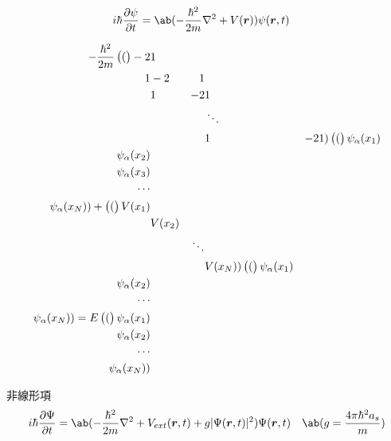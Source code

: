 \documentclass[uplatex,diffipdfmx,a4paper,11pt]{jlreq}
\begin{document}
\begin{definition}[TDSE]
  \begin{align}
    i\hbar\diffp{\psi}{t} & = \ab(-\frac{\hbar^2}{2m}\nabla^2 + V(\rr))\psi(\rr, t)
  \end{align}
\end{definition}
\begin{align}
  - \frac{\hbar^2}{2m}
  \begin{pmatrix}(\end{pmatrix}-2     & 1      &        &         &    &    \\
  1            & -2     & 1      &         &    &    \\
               & 1      & -2     & 1       &    &    \\
               &        &        & \ddots  &    &    \\
               &        &        & 1       & -2 & 1)
  \begin{pmatrix}(\end{pmatrix}\psi_\alpha(x_1)                             \\ \psi_\alpha(x_2) \\ \psi_\alpha(x_3) \\ \cdots \\ \psi_\alpha(x_N)) +
  \begin{pmatrix}(\end{pmatrix}V(x_1) &        &        &                   \\
               & V(x_2) &        &                   \\
               &        & \ddots &                   \\
               &        &        & V(x_N))
  \begin{pmatrix}(\end{pmatrix}\psi_\alpha(x_1)                             \\ \psi_\alpha(x_2) \\ \cdots \\ \psi_\alpha(x_N))
  =
  E\begin{pmatrix}(\end{pmatrix}\psi_\alpha(x_1)                            \\ \psi_\alpha(x_2) \\ \cdots \\ \psi_\alpha(x_N))
\end{align}

\begin{definition}
  非線形項
  \begin{align}
    i\hbar\diffp{\Psi}{t} & = \ab(-\frac{\hbar^2}{2m}\nabla^2 + V_{ext}(\rr, t) + g|\Psi(\rr, t)|^2)\Psi(\rr, t) & \ab(g = \frac{4\pi\hbar^2 a_s}{m})
  \end{align}

\end{definition}
\end{document}
